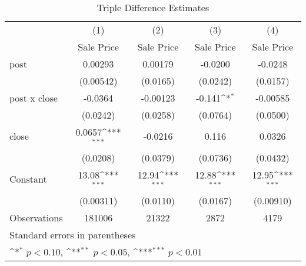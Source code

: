 \begin{table}[htbp]\centering
\def\sym#1{\ifmmode^{#1}\else\(^{#1}\)\fi}
\caption{Triple Difference Estimates\label{tabl}}
\begin{tabular}{l*{4}{c}}
\hline\hline
                    &\multicolumn{1}{c}{(1)}&\multicolumn{1}{c}{(2)}&\multicolumn{1}{c}{(3)}&\multicolumn{1}{c}{(4)}\\
                    &\multicolumn{1}{c}{Sale Price}&\multicolumn{1}{c}{Sale Price}&\multicolumn{1}{c}{Sale Price}&\multicolumn{1}{c}{Sale Price}\\
\hline
post                &     0.00293         &     0.00179         &     -0.0200         &     -0.0248         \\
                    &   (0.00542)         &    (0.0165)         &    (0.0242)         &    (0.0157)         \\
[1em]
post x close        &     -0.0364         &    -0.00123         &      -0.141\sym{*}  &    -0.00585         \\
                    &    (0.0242)         &    (0.0258)         &    (0.0764)         &    (0.0500)         \\
[1em]
close               &      0.0657\sym{***}&     -0.0216         &       0.116         &      0.0326         \\
                    &    (0.0208)         &    (0.0379)         &    (0.0736)         &    (0.0432)         \\
[1em]
Constant            &       13.08\sym{***}&       12.94\sym{***}&       12.88\sym{***}&       12.95\sym{***}\\
                    &   (0.00311)         &    (0.0110)         &    (0.0167)         &   (0.00910)         \\
\hline
Observations        &      181006         &       21322         &        2872         &        4179         \\
\hline\hline
\multicolumn{5}{l}{\footnotesize Standard errors in parentheses}\\
\multicolumn{5}{l}{\footnotesize \sym{*} \(p<0.10\), \sym{**} \(p<0.05\), \sym{***} \(p<0.01\)}\\
\end{tabular}
\end{table}
